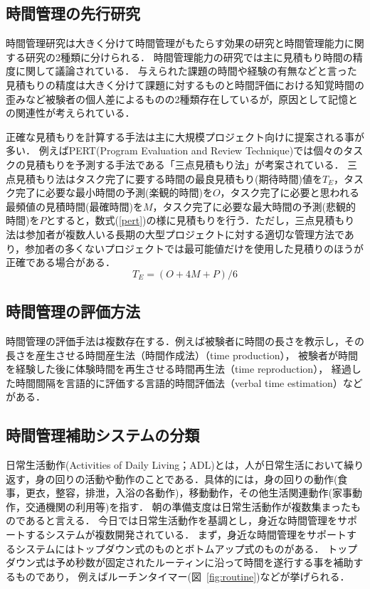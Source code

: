 \documentclass[submit,techrep,noauthor]{ipsj}
\begin{document}
\subsection{時間管理の先行研究}
時間管理研究は大きく分けて時間管理がもたらす効果の研究と時間管理能力に関する研究の2種類に分けられる．
時間管理能力の研究では主に見積もり時間の精度に関して議論されている．
与えられた課題の時間や経験の有無\cite{Roy2007}などと言った見積もりの精度は大きく分けて課題に対するものと時間評価における知覚時間の歪み\cite{Oguro1961}\cite{Murakami2016}など被験者の個人差によるものの2種類存在しているが，原因として記憶との関連性が考えられている．

正確な見積もりを計算する手法は主に大規模プロジェクト向けに提案される事が多い．
例えばPERT(Program Evaluation and Review Technique)では個々のタスクの見積もりを予測する手法である「三点見積もり法」が考案されている．
三点見積もり法はタスク完了に要する時間の最良見積もり(期待時間)値を$T_{E}$，タスク完了に必要な最小時間の予測(楽観的時間)を$O$，タスク完了に必要と思われる最頻値の見積時間(最確時間)を$M$，タスク完了に必要な最大時間の予測(悲観的時間)を$P$とすると，数式(\ref{pert})の様に見積もりを行う．ただし，三点見積もり法は参加者が複数人いる長期の大型プロジェクトに対する適切な管理方法であり，参加者の多くないプロジェクトでは最可能値だけを使用した見積りのほうが正確である場合がある\cite{Kato1965}．
\begin{equation}
\label{pert}
T_{E} = (O + 4M + P) /6
\end{equation}

\subsection{時間管理の評価方法}
時間管理の評価手法は複数存在する．例えば被験者に時間の長さを教示し，その長さを産生させる時間産生法（時間作成法）（time production），
被験者が時間を経験した後に体験時間を再生させる時間再生法（time reproduction），
経過した時間間隔を言語的に評価する言語的時間評価法（verbal time estimation）などがある\cite{Oguro1961}．

\subsection{時間管理補助システムの分類}
日常生活動作(Activities of Daily Living；ADL)とは，人が日常生活において繰り返す，身の回りの活動や動作のことである．具体的には，身の回りの動作(食事，更衣，整容，排泄，入浴の各動作)，移動動作，その他生活関連動作(家事動作，交通機関の利用等)を指す\cite{Sakai2003}．
朝の準備支度は日常生活動作が複数集まったものであると言える．
今日では日常生活動作を基調とし，身近な時間管理をサポートするシステムが複数開発されている．
まず，身近な時間管理をサポートするシステムにはトップダウン式のものとボトムアップ式のものがある．
トップダウン式は予め秒数が固定されたルーティンに沿って時間を遂行する事を補助するものであり，
例えばルーチンタイマー(図~\ref{fig:routine})などが挙げられる．
\end{document}
